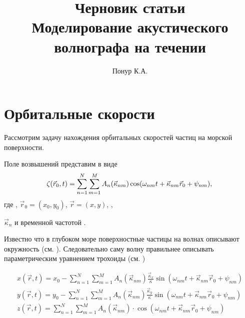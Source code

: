 



\newcommand\fullsum{\sum\limits_{n=1}^{N} \sum\limits_{m=1}^{M}}
\newcommand\fullphase{\omega_{nm}t + \vec \kappa_{nm}\vec r_0 + \psi_{nm}}

\title{Черновик статьи \\ \textbf{Моделирование акустического волнографа на
течении}}
\author{Понур К.А.}


\maketitle

\section*{Орбитальные скорости}%
\label{sec:orbital_nye_skorosti}

Рассмотрим задачу нахождения орбитальных скоростей частиц на морской
поверхности.

Поле возвышений  представим в виде
\begin{equation}
    \label{eq:surface3d_default}
    \zeta(\vec r_0,t) = \fullsum A_n(\vec \kappa_{nm}) \cos(\fullphase),    \\
\end{equation}
где ,  
$\vec r_0 = (x_0, y_0)$, $\vec r = (x, y)$, 
, 

$\vec \kappa_n$ и временной частотой
.



Известно что в глубоком море
поверхностные частицы на волнах описывают окружность (см. \cite{shuleykin}).
Следовательно саму волну правильнее описывать параметрическим уравнением
трохоиды (см. \cite{nouguier})

\begin{equation}
    \begin{gathered}
        \label{eq:surface3d_cwm}
        x(\vec r,t) = x_0 - \fullsum A_n(\vec \kappa_{nm})\frac{\vec \kappa_x}{\kappa}        \sin(\fullphase)\\
        y(\vec r,t) = y_0 - \fullsum A_n(\vec \kappa_{nm}) \frac{\vec \kappa_y}{\kappa}
        \sin(\fullphase)\\
        z(\vec r,t) = \fullsum
        A_n(\vec \kappa_{nm}) \cdot \cos(\fullphase)    \\
    \end{gathered}
\end{equation}

